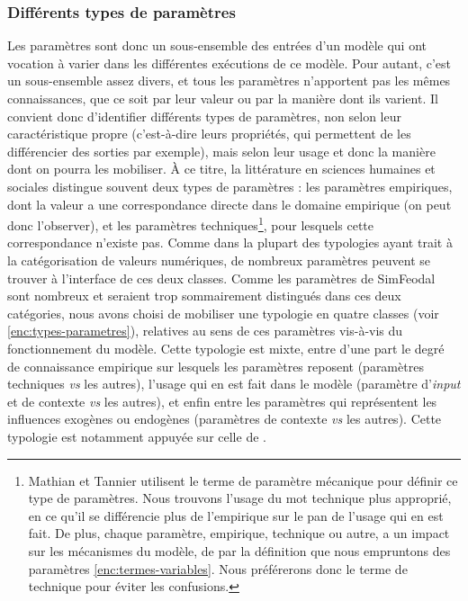 \subsubsection{Différents types de paramètres}

Les paramètres sont donc un sous-ensemble des entrées d'un modèle qui ont vocation à varier dans les différentes exécutions de ce modèle.
Pour autant, c'est un sous-ensemble assez divers, et tous les paramètres n'apportent pas les mêmes connaissances, que ce soit par leur valeur ou par la manière dont ils varient.
Il convient donc d'identifier différents types de paramètres, non selon leur caractéristique propre (c'est-à-dire leurs propriétés, qui permettent de les différencier des sorties par exemple), mais selon leur usage et donc la manière dont on pourra les mobiliser.
À ce titre, la littérature en sciences humaines et sociales
distingue souvent deux types de paramètres :
	les paramètres empiriques, dont la valeur a une correspondance directe dans le domaine empirique (on peut donc l'observer), et les paramètres techniques\footnote{
		Mathian et Tannier \autocite{mathian_formalisation_2015} utilisent le terme de paramètre mécanique pour définir ce type de paramètres.
		Nous trouvons l'usage du mot \og technique\fg{} plus approprié, en ce qu'il se différencie plus de l'empirique sur le pan de l'usage qui en est fait.
		De plus, chaque paramètre, empirique, technique ou autre, a un impact sur les mécanismes du modèle, de par la définition que nous empruntons des paramètres \cref{enc:termes-variables}.
		Nous préférerons donc le terme de \og technique\fg{} pour éviter les confusions.
	}, pour lesquels cette correspondance n'existe pas.
Comme dans la plupart des typologies ayant trait à la catégorisation de valeurs numériques, de nombreux paramètres peuvent se trouver à l'interface de ces deux classes.
Comme les paramètres de SimFeodal sont nombreux et seraient trop sommairement distingués dans ces deux catégories, nous avons choisi de mobiliser une typologie en quatre classes (voir \cref{enc:types-parametres}), relatives au sens de ces paramètres vis-à-vis du fonctionnement du modèle.
Cette typologie est mixte, entre d'une part le degré de connaissance empirique sur lesquels les paramètres reposent (paramètres techniques \textit{vs} les autres), l'usage qui en est fait dans le modèle (paramètre d'\textit{input} et de contexte \textit{vs} les autres), et enfin entre les paramètres qui représentent les influences exogènes ou endogènes (paramètres de contexte \textit{vs} les autres).
Cette typologie est notamment appuyée sur celle de \textcite[45]{tannier_analyse_2017}.

